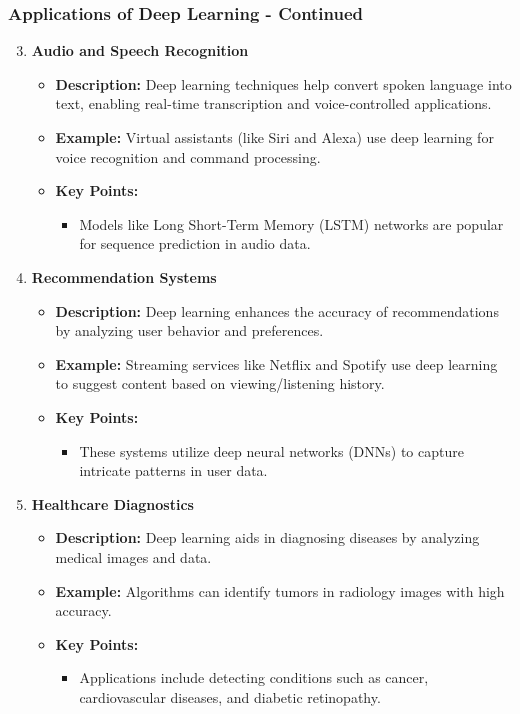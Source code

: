 \documentclass[aspectratio=169]{beamer}
\begin{document}
\begin{frame}[fragile]
  \frametitle{Applications of Deep Learning - Continued}
  \begin{enumerate}
    \setcounter{enumi}{2} %
    \item \textbf{Audio and Speech Recognition}
      \begin{itemize}
          \item \textbf{Description:} Deep learning techniques help convert spoken language into text, enabling real-time transcription and voice-controlled applications.
          \item \textbf{Example:} Virtual assistants (like Siri and Alexa) use deep learning for voice recognition and command processing.
          \item \textbf{Key Points:}
            \begin{itemize}
                \item Models like Long Short-Term Memory (LSTM) networks are popular for sequence prediction in audio data.
            \end{itemize}
      \end{itemize}

    \item \textbf{Recommendation Systems}
      \begin{itemize}
          \item \textbf{Description:} Deep learning enhances the accuracy of recommendations by analyzing user behavior and preferences.
          \item \textbf{Example:} Streaming services like Netflix and Spotify use deep learning to suggest content based on viewing/listening history.
          \item \textbf{Key Points:}
            \begin{itemize}
                \item These systems utilize deep neural networks (DNNs) to capture intricate patterns in user data.
            \end{itemize}
      \end{itemize}

    \item \textbf{Healthcare Diagnostics}
      \begin{itemize}
          \item \textbf{Description:} Deep learning aids in diagnosing diseases by analyzing medical images and data.
          \item \textbf{Example:} Algorithms can identify tumors in radiology images with high accuracy.
          \item \textbf{Key Points:}
            \begin{itemize}
                \item Applications include detecting conditions such as cancer, cardiovascular diseases, and diabetic retinopathy.
            \end{itemize}
      \end{itemize}
  \end{enumerate}
\end{frame}
\end{document}
